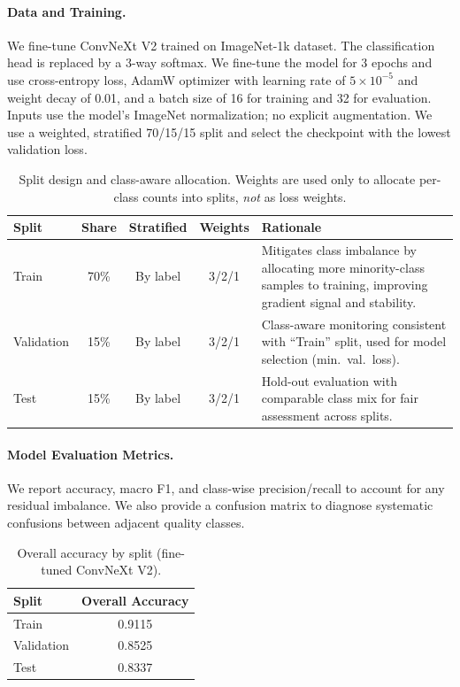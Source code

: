 \paragraph{Data and Training.} We fine-tune ConvNeXt V2 trained on ImageNet-1k dataset. The classification head is replaced by a 3-way softmax. We fine-tune the model for 3 epochs and use cross-entropy loss, AdamW optimizer with learning rate of $5\times10^{-5}$ and weight decay of 0.01, and a batch size of 16 for training and 32 for evaluation. Inputs use the model’s ImageNet normalization; no explicit augmentation. We use a weighted, stratified 70/15/15 split and select the checkpoint with the lowest validation loss.

\begin{table}[h!]
\centering
\small
\begin{tabular}{lccc p{6.8cm}}
\toprule
\textbf{Split} & \textbf{Share} & \textbf{Stratified} & \textbf{Weights} & \textbf{Rationale} \\
\midrule
Train       & 70\% & By label & 3/2/1 & Mitigates class imbalance by allocating more minority-class samples to training, improving gradient signal and stability. \\
Validation  & 15\% & By label & 3/2/1 & Class-aware monitoring consistent with ``Train'' split, used for model selection (min.\ val.\ loss). \\
Test        & 15\% & By label & 3/2/1 & Hold-out evaluation with comparable class mix for fair assessment across splits. \\
\bottomrule
\end{tabular}
\caption{Split design and class-aware allocation. Weights are used only to allocate per-class counts into splits, \emph{not} as loss weights.}
\label{tab:splits}
\end{table}


\paragraph{Model Evaluation Metrics.} We report accuracy, macro F1, and class-wise precision/recall to account for any residual imbalance. We also provide a confusion matrix to diagnose systematic confusions between adjacent quality classes.

\begin{table}[h!]
    \centering

    \caption{Overall accuracy by split (fine-tuned ConvNeXt V2).}
    \begin{tabular}{l c}
        \hline
        Split & Overall Accuracy \\
        \hline
        Train & 0.9115 \\
        Validation & 0.8525 \\
        Test & 0.8337 \\
        \hline
    \end{tabular}
    \label{tab:overall_acc_tiny}
\end{table}

